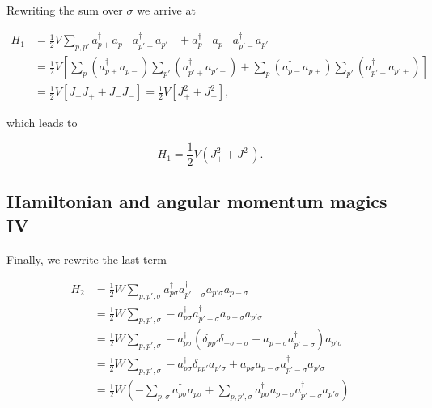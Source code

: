 \documentclass[11pt]{article}
\begin{document}
Rewriting the sum over \(\sigma\) we arrive at

    \[
\begin{align*}
H_1 &= \frac{1}{2} V\sum_{p,p'}
a_{p+}^\dagger a_{p-} a_{p'+}^\dagger a_{p'-} +
a_{p-}^\dagger a_{p+} a_{p'-}^\dagger a_{p'+} \\
&= \frac{1}{2} V \left[ \sum_p \left( a_{p+}^\dagger a_{p-} \right)
\sum_{p'} \left( a_{p'+}^\dagger a_{p'-} \right) +
\sum_p \left( a_{p-}^\dagger a_{p+} \right)
\sum_{p'} \left( a_{p'-}^\dagger a_{p'+} \right) \right] \\
&= \frac{1}{2} V \left[ J_+ J_+ + J_- J_- \right] = \frac{1}{2} V \left[ J_+^2 + J_-^2 \right] ,
\end{align*}
\]

    which leads to

    \hypertarget{eq:H1ny}{}

\[
\begin{equation}
H_1 = \frac{1}{2} V \left( J_+^2 + J_-^2 \right).
\label{eq:H1ny} \tag{15}
\end{equation}
\]

    \hypertarget{hamiltonian-and-angular-momentum-magics-iv}{%
\subsection{Hamiltonian and angular momentum magics
IV}\label{hamiltonian-and-angular-momentum-magics-iv}}

Finally, we rewrite the last term

    \[
\begin{align*}
H_2 &= \frac{1}{2} W \sum_{p,p',\sigma}
a_{p\sigma}^\dagger a_{p'-\sigma}^\dagger a_{p'\sigma} a_{p-\sigma} \\
&= \frac{1}{2} W \sum_{p,p',\sigma}
-a_{p\sigma}^\dagger a_{p'-\sigma}^\dagger a_{p-\sigma} a_{p'\sigma} \\
&= \frac{1}{2} W \sum_{p,p',\sigma}
-a_{p\sigma}^\dagger \left( \delta_{pp'} \delta_{-\sigma -\sigma} -
a_{p-\sigma} a_{p'-\sigma}^\dagger \right) a_{p'\sigma} \\
&= \frac{1}{2} W \sum_{p,p',\sigma}
-a_{p\sigma}^\dagger \delta_{pp'} a_{p'\sigma} +
a_{p\sigma}^\dagger a_{p-\sigma} a_{p'-\sigma}^\dagger a_{p'\sigma} \\
&= \frac{1}{2} W \left( -\sum_{p,\sigma}
a_{p\sigma}^\dagger a_{p\sigma} +
\sum_{p,p',\sigma} a_{p\sigma}^\dagger a_{p-\sigma} a_{p'-\sigma}^\dagger a_{p'\sigma} \right) \\
\end{align*}
\]
\end{document}
